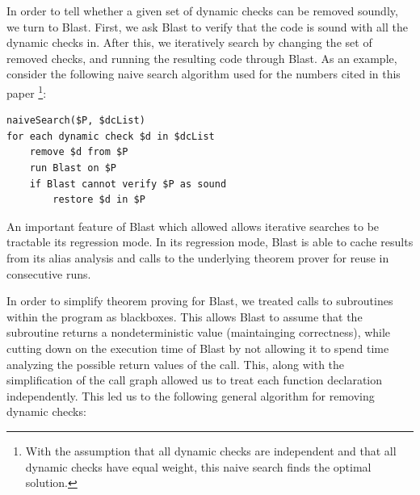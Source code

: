 \documentclass[10pt,letterpaper,twocolumn,english]{article}
\begin{document}
 


In order to tell whether a given set of dynamic checks can be removed
soundly, we turn to Blast.  First, we ask Blast to verify that the code
is sound with all the dynamic checks in.  After this, we iteratively
search by changing the set of removed checks, and running the resulting
code through Blast.  As an example, consider the following naive search
algorithm used for the numbers cited in this paper \footnote{With the
assumption that all dynamic checks are independent and that all dynamic
checks have equal weight, this naive search finds the optimal
solution.}:

\begin{verbatim}
naiveSearch($P, $dcList)
for each dynamic check $d in $dcList
    remove $d from $P
    run Blast on $P
    if Blast cannot verify $P as sound
        restore $d in $P
\end{verbatim}

An important feature of Blast which allowed allows iterative searches to
be tractable its regression mode.  In its regression mode, Blast is able
to cache results from its alias analysis and calls to the underlying
theorem prover for reuse in consecutive runs.

In order to simplify theorem proving for Blast, we treated calls to
subroutines within the program as blackboxes.  This allows Blast to
assume that the subroutine returns a nondeterministic value
(maintainging correctness), while cutting down on the execution time of
Blast by not allowing it to spend time analyzing the possible return
values of the call.  This, along with the simplification of the call
graph allowed us to treat each function declaration independently.  This
led us to the following general algorithm for removing dynamic checks:
\end{document}
